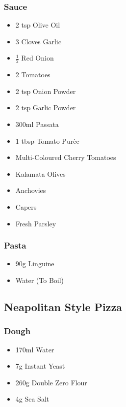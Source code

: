 \documentclass[11pt, english]{article}
\begin{document}
		\subsubsection*{Sauce}
		
	\begin{itemize}
	\setlength\itemsep{0cm}
		\item 2 tsp Olive Oil
		\item 3 Cloves Garlic
		\item $\frac{1}{2}$ Red Onion
		\item 2 Tomatoes
		\item 2 tsp Onion Powder
		\item 2 tsp Garlic Powder
		\item 300ml Passata
		\item 1 tbsp Tomato Pur\`{e}e
		\item Multi-Coloured Cherry Tomatoes
		\item Kalamata Olives
		\item Anchovies
		\item Capers
		\item Fresh Parsley

	\end{itemize}

		\subsubsection*{Pasta}

        \begin{itemize}
        \setlength\itemsep{0cm}
                \item 90g Linguine 
                \item Water (To Boil)
        \end{itemize}

\newpage

	\subsection{Neapolitan Style Pizza}

		\subsubsection*{Dough}

	\begin{itemize}
        \setlength\itemsep{0cm}
                \item 170ml Water
		\item 7g Instant Yeast
		\item 260g Double Zero Flour
		\item 4g Sea Salt
        \end{itemize}
\end{document}
